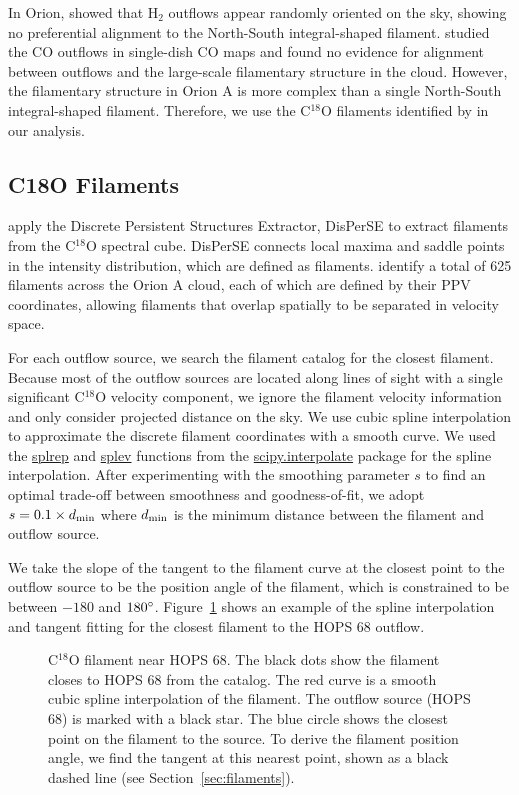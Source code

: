 \documentclass[twocolumn]{aastex63}
\newcommand{\example}{HOPS 68}
\begin{document}
In Orion, \citet{Davis09} showed that H$_{2}$ outflows appear randomly oriented on the sky, showing no preferential alignment to the North-South integral-shaped filament. \citet{Tanabe:submitted} studied the CO outflows in single-dish CO maps and found no evidence for alignment between outflows and the large-scale filamentary structure in the cloud. However, the filamentary structure in Orion A is more complex than a single North-South integral-shaped filament. Therefore, we use the C$^{18}$O filaments identified by \citet{Suri19} in our analysis.

\subsection{C18O Filaments}
\citet{Suri19} apply the Discrete Persistent Structures Extractor, DisPerSE \citep{Sousbie11} to extract filaments from the C$^{18}$O spectral cube. DisPerSE connects local maxima and saddle points in the intensity distribution, which are defined as filaments. \citet{Suri19} identify a total of 625 filaments across the Orion A cloud, each of which are defined by their PPV coordinates, allowing filaments that overlap spatially to be separated in velocity space. 

For each outflow source, we search the filament catalog for the closest filament. Because most of the outflow sources are located along lines of sight with a single significant C$^{18}$O velocity component, we ignore the filament velocity information and only consider projected distance on the sky. We use cubic spline interpolation to approximate the discrete filament coordinates with a smooth curve. We used the \url{splrep} and \url{splev} functions from the \url{scipy.interpolate} package for the spline interpolation. After experimenting with the smoothing parameter $s$ to find an optimal trade-off between smoothness and goodness-of-fit, we adopt $s = 0.1\times d_{\rm min}$ where $d_{\rm min}$ is the minimum distance between the filament and outflow source.

We take the slope of the tangent to the filament curve at the closest point to the outflow source to be the position angle of the filament, which is constrained to be between $-180$ and $180\mbox{$^\circ$}$. Figure~\ref{fig:filament} shows an example of the spline interpolation and tangent fitting for the closest filament to the \example{} outflow.

\begin{figure}
\caption{C$^{18}$O filament near \example{}. The black dots show the filament closes to \example{} from the \citet{Suri19} catalog. The red curve is a smooth cubic spline interpolation of the filament. The outflow source (\example{}) is marked with a black star. The blue circle shows the closest point on the filament to the source. To derive the filament position angle, we find the tangent at this nearest point, shown as a black dashed line (see Section~\ref{sec:filaments}).\label{fig:filament}}
\end{figure}
\end{document}
